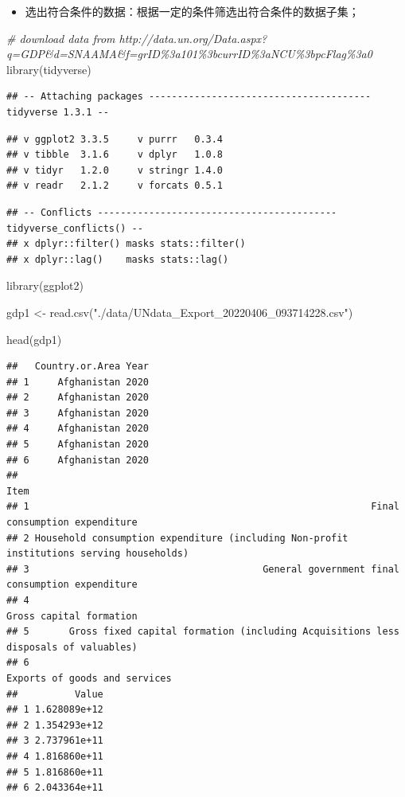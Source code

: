 \documentclass[
]{book}
\newenvironment{Shaded}{\begin{snugshade}}{\end{snugshade}}
\newcommand{\CommentTok}[1]{\textcolor[rgb]{0.56,0.35,0.01}{\textit{#1}}}
\newcommand{\FunctionTok}[1]{\textcolor[rgb]{0.00,0.00,0.00}{#1}}
\newcommand{\NormalTok}[1]{#1}
\newcommand{\OtherTok}[1]{\textcolor[rgb]{0.56,0.35,0.01}{#1}}
\newcommand{\StringTok}[1]{\textcolor[rgb]{0.31,0.60,0.02}{#1}}
\providecommand{\tightlist}{%
  \setlength{\itemsep}{0pt}\setlength{\parskip}{0pt}}
\begin{document}
\begin{itemize}
\tightlist
\item
  选出符合条件的数据：根据一定的条件筛选出符合条件的数据子集；
\end{itemize}

\begin{Shaded}
\begin{Highlighting}[]
\CommentTok{\# download data from http://data.un.org/Data.aspx?q=GDP\&d=SNAAMA\&f=grID\%3a101\%3bcurrID\%3aNCU\%3bpcFlag\%3a0}
\FunctionTok{library}\NormalTok{(tidyverse)}
\end{Highlighting}
\end{Shaded}

\begin{verbatim}
## -- Attaching packages --------------------------------------- tidyverse 1.3.1 --
\end{verbatim}

\begin{verbatim}
## v ggplot2 3.3.5     v purrr   0.3.4
## v tibble  3.1.6     v dplyr   1.0.8
## v tidyr   1.2.0     v stringr 1.4.0
## v readr   2.1.2     v forcats 0.5.1
\end{verbatim}

\begin{verbatim}
## -- Conflicts ------------------------------------------ tidyverse_conflicts() --
## x dplyr::filter() masks stats::filter()
## x dplyr::lag()    masks stats::lag()
\end{verbatim}

\begin{Shaded}
\begin{Highlighting}[]
\FunctionTok{library}\NormalTok{(ggplot2)}

\NormalTok{gdp1 }\OtherTok{\textless{}{-}} \FunctionTok{read.csv}\NormalTok{(}\StringTok{"./data/UNdata\_Export\_20220406\_093714228.csv"}\NormalTok{)}

\FunctionTok{head}\NormalTok{(gdp1)}
\end{Highlighting}
\end{Shaded}

\begin{verbatim}
##   Country.or.Area Year
## 1     Afghanistan 2020
## 2     Afghanistan 2020
## 3     Afghanistan 2020
## 4     Afghanistan 2020
## 5     Afghanistan 2020
## 6     Afghanistan 2020
##                                                                                       Item
## 1                                                            Final consumption expenditure
## 2 Household consumption expenditure (including Non-profit institutions serving households)
## 3                                         General government final consumption expenditure
## 4                                                                  Gross capital formation
## 5       Gross fixed capital formation (including Acquisitions less disposals of valuables)
## 6                                                            Exports of goods and services
##          Value
## 1 1.628089e+12
## 2 1.354293e+12
## 3 2.737961e+11
## 4 1.816860e+11
## 5 1.816860e+11
## 6 2.043364e+11
\end{verbatim}
\end{document}
